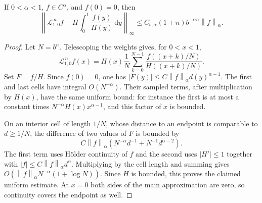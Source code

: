 \documentclass[11pt,a4paper]{article}
\numberwithin{equation}{section}
\theoremstyle{definition}
\theoremstyle{remark}
\newcommand{\dd}{\,\mathrm d}
\newcommand{\Lop}{\mathcal L}
\newcommand{\norm}[1]{\left\lVert#1\right\rVert}
\begin{document}
\begin{lemma}
\label{lem:quadrature}
If $0<\alpha<1$, $f\in C^\alpha$, and $f(0)=0$, then
\begin{equation}
 \left\|\Lop_{1,0}^{\,n}f-
 H\int_0^1\frac{f(y)}{H(y)}\dd y\right\|_\infty
 \le C_{b,\alpha}(1+n)b^{-\alpha n}\norm f_\alpha.
 \label{eq:quadrature}
\end{equation}
\end{lemma}
\begin{proof}
Let $N=b^n$. Telescoping the weights gives, for $0<x<1$,
\begin{equation}
 \Lop_{1,0}^{\,n}f(x)=H(x)\frac1N
 \sum_{k=0}^{N-1}\frac{f((x+k)/N)}{H((x+k)/N)}.
 \label{eq:riemann-critical}
\end{equation}
Set $F=f/H$. Since $f(0)=0$, one has
$|F(y)|\le C\norm f_\alpha d(y)^{\alpha-1}$.
The first and last cells have integral $O(N^{-\alpha})$.
Their sampled terms, after multiplication by $H(x)$, have the same
uniform bound: for instance the first is at most a constant times
$N^{-\alpha}H(x)x^{\alpha-1}$, and this factor of $x$ is bounded.

On an interior cell of length $1/N$, whose distance to an endpoint is
comparable to $d\ge1/N$, the difference of two values of $F$ is bounded by
\begin{equation}
 C\norm f_\alpha
 \left(N^{-\alpha}d^{-1}+N^{-1}d^{\alpha-2}\right).
 \label{eq:cell-error}
\end{equation}
The first term uses H\"older continuity of $f$ and the second uses
$|H'|\le1$ together with $|f|\le C\norm f_\alpha d^\alpha$.
Multiplying by the cell length and summing gives
$O(\norm f_\alpha N^{-\alpha}(1+\log N))$.
Since $H$ is bounded, this proves the claimed uniform estimate.
At $x=0$ both sides of the main approximation are zero, so continuity
covers the endpoint as well.
\end{proof}
\end{document}
